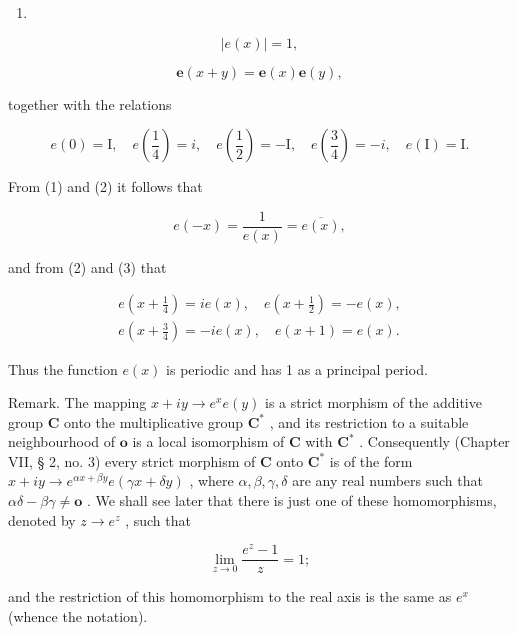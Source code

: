 \begin{enumerate}
\def\labelenumi{(\arabic{enumi})}
\tightlist
\item
\end{enumerate}

\[
\left| e (x) \right| = 1,\tag{2}
\]

\[
\boldsymbol {e} (x + y) = \boldsymbol {e} (x) \boldsymbol {e} (y),
\]

together with the relations

\[
e (0) = \mathrm{I}, \quad e (\frac {1}{4}) = i, \quad e (\frac {1}{2}) = - \mathrm{I}, \quad e (\frac {3}{4}) = - i, \quad e (\mathrm{I}) = \mathrm{I}. \tag {3}
\]

From (1) and (2) it follows that

\[
e (- x) = \frac {1}{e (x)} = \overline {{{{e (x)}}}},\tag{4}
\]

and from (2) and (3) that

\[
\begin{array}{l} e (x + \frac {1}{4}) = i e (x), \quad e (x + \frac {1}{2}) = - e (x), \\ e (x + \frac {3}{4}) = - i e (x), \quad e (x + 1) = e (x). \end{array}
\]

Thus the function \(e(x)\) is periodic and has 1 as a principal period.

Remark. The mapping \(x + iy \to e^x e(y)\) is a strict morphism of the additive group \(\mathbf{C}\) onto the multiplicative group \(\mathbf{C}^*\) , and its restriction to a suitable neighbourhood of \(\mathbf{o}\) is a local isomorphism of \(\mathbf{C}\) with \(\mathbf{C}^*\) . Consequently (Chapter VII, § 2, no. 3) every strict morphism of \(\mathbf{C}\) onto \(\mathbf{C}^*\) is of the form \(x + iy \to e^{\alpha x + \beta y} e(\gamma x + \delta y)\) , where \(\alpha, \beta, \gamma, \delta\) are any real numbers such that \(\alpha \delta - \beta \gamma \neq \mathbf{o}\) . We shall see later that there is just one of these homomorphisms, denoted by \(z \rightarrow e^{z}\) , such that

\[
\lim _ {z \rightarrow 0} \frac {e ^ {z} - 1}{z} = 1;
\]

and the restriction of this homomorphism to the real axis is the same as \(e^{x}\) (whence the notation).

